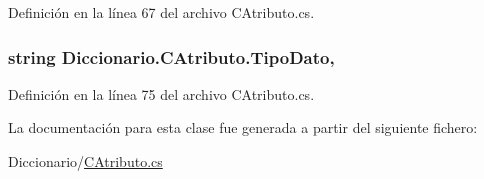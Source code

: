 Definición en la línea 67 del archivo C\-Atributo.\-cs.

\hypertarget{class_diccionario_1_1_c_atributo_a6287a1296fc232ada4583479ab0d0f9a}{
\subsubsection[{Tipo\-Dato}]{\setlength{\rightskip}{0pt plus 5cm}string Diccionario.\-C\-Atributo.\-Tipo\-Dato\hspace{0.3cm}{\ttfamily [get]}, {\ttfamily [set]}}}\label{class_diccionario_1_1_c_atributo_a6287a1296fc232ada4583479ab0d0f9a}


Definición en la línea 75 del archivo C\-Atributo.\-cs.



La documentación para esta clase fue generada a partir del siguiente fichero\-:\begin{DoxyCompactItemize}
\item 
Diccionario/\hyperlink{_c_atributo_8cs}{C\-Atributo.\-cs}\end{DoxyCompactItemize}
